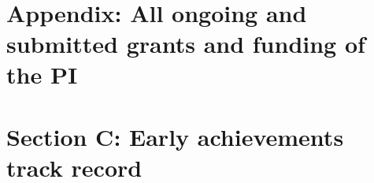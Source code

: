 \documentclass[11pt,a4paper]{article}
\begin{document}
\clearpage



~ 


\clearpage

%

\clearpage

\section*{Appendix: All ongoing and submitted grants and funding of the PI}

%

\clearpage

\section*{Section C: Early achievements track record}

%
\end{document}
